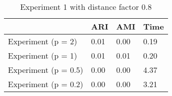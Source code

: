 \begin{table}
\centering
\caption{Experiment 1 with distance factor 0.8}
\begin{tabular}{llll}
\toprule
{} &   ARI &   AMI &  Time \\
\midrule
Experiment (p = 2)   &  0.01 &  0.00 &  0.19 \\
Experiment (p = 1)   &  0.01 &  0.01 &  0.20 \\
Experiment (p = 0.5) &  0.00 &  0.00 &  4.37 \\
Experiment (p = 0.2) &  0.00 &  0.00 &  3.21 \\
\bottomrule
\end{tabular}
\end{table}
